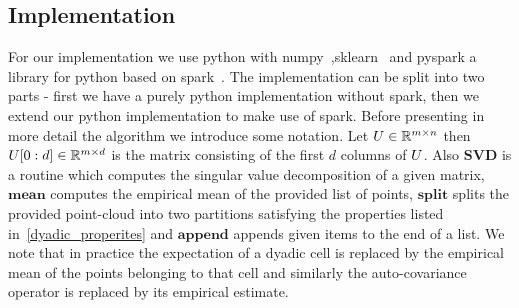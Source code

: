 \documentclass{article}
\begin{document}
  \subsection{Implementation}
  For our implementation we use python with numpy~\cite{van2011numpy},sklearn~\cite{pedregosa2011scikit} and pyspark a library for python based on spark~\cite{zaharia2010spark}. The implementation can be split into two parts - first we have a purely python implementation without spark, then we extend our python implementation to make use of spark. Before presenting in more detail the algorithm we introduce some notation. Let ${U} \in \mathbb{R}^{m\times n}$ then ${U}[0:d] \in \mathbb{R}^{m\times d}$ is the matrix consisting of the first $d$ columns of ${U}$. Also $\mathbf{SVD}$ is a routine which computes the singular value decomposition of a given matrix, $\mathbf{mean}$ computes the empirical mean of the provided list of points, $\mathbf{split}$ splits the provided point-cloud into two partitions satisfying the properties listed in~\ref{dyadic_properites} and $\mathbf{append}$ appends given items to the end of a list. We note that in practice the expectation of a dyadic cell is replaced by the empirical mean of the points belonging to that cell and similarly the auto-covariance operator is replaced by its empirical estimate.\\
\end{document}
